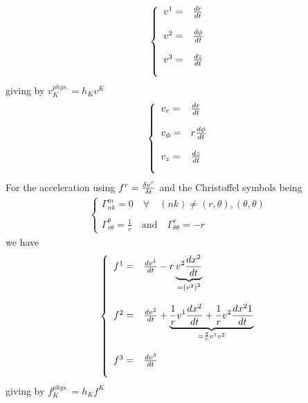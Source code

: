 \begin{align}
\left\{\begin{array}{lll}
v^1= &\dv{r}{t}\\\\
v^2= &\dv{\phi}{t}\\\\
v^3= &\dv{z}{t}\\\\
\end{array}\right.
\end{align}
giving by $v_{K}^{phys.} = h_K v^K$
\begin{align}
\left\{\begin{array}{lll}
v_r= &\dv{r}{t}\\\\
v_{\phi}= &r\dv{\phi}{t}\\\\
v_z= &\dv{z}{t}\\\\
\end{array}\right.
\end{align}
For the acceleration using $f^r=\fdv{v^r}{t} $
and the Christoffel symbols being 
\begin{align}
\left \{ \begin{array}{c}
\Gamma^m_{nk} = 0 \quad\forall\quad (nk) \ne (r, \theta), (\theta, \theta)\\\\
\Gamma^{\theta}_{r\theta} = \frac{1}{r} \quad\text{and}\quad \Gamma^r_{\theta\theta} = -r
\end{array}\right.\
\end{align}
we have
\begin{align}
\left\{\begin{array}{lll}
f^1= &\dv{v^1}{t}-r\underbrace{v^2\dv{x^2}{t}}_{=\left(v^2\right)^2}\\\\
f^2= &\dv{v^2}{t}+\underbrace{\frac{1}{r}v^1\dv{x^2}{t}+\frac{1}{r}v^2\dv{x^21}{t}}_{=\frac{2}{r}v^1 v^2}\\\\
f^3= &\dv{v^3}{t}\\\\
\end{array}\right.
\end{align}
giving by $f_{K}^{phys.} = h_K f^K$
